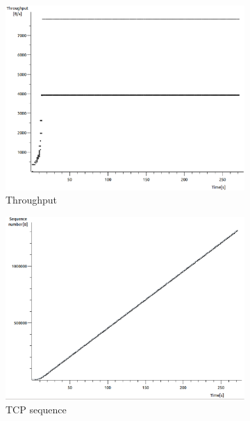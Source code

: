 \documentclass[conference,a4paper]{IEEEtran}
\begin{document}
\begin{figure}
 \centering
 \begin{subfigure}[b]{0.2\textwidth}
  \includegraphics[width=\textwidth]{s7-3_th}
  \caption{Throughput}
 \end{subfigure}
 \begin{subfigure}[b]{0.2\textwidth}
  \includegraphics[width=\textwidth]{s7-3_seq}
  \caption{TCP sequence}
 \end{subfigure}
 \begin{subfigure}[b]{0.2\textwidth}

\end{subfigure}
\end{figure}
\end{document}
